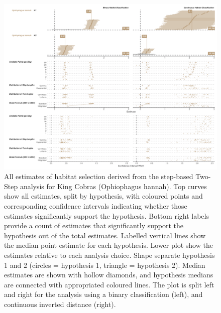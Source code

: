 \documentclass[10pt,a4paper]{article}
\begin{document}
\begin{figure}
\includegraphics[width=1\linewidth]{../../figures/specCurve_Ophiophagus hannah_twoStep} \caption{All estimates of habitat selection derived from the step-based Two-Step analysis for King Cobras (Ophiophagus hannah). Top curves show all estimates, split by hypothesis, with coloured points and corresponding confidence intervals indicating whether those estimates significantly support the hypothesis. Bottom right labels provide a count of estimates that significantly support the hypothesis out of the total estimates. Labelled vertical lines show the median point estimate for each hypothesis. Lower plot show the estimates relative to each analysis choice. Shape separate hypothesis 1 and 2 (circles = hypothesis 1, triangle = hypothesis 2). Median estimates are shown with hollow diamonds, and hypothesis medians are connected with appropriated coloured lines. The plot is split left and right for the analysis using a binary classification (left), and continuous inverted distance (right).}\label{fig:specCurveTwoStepOPHA}
\end{figure}
\end{document}
